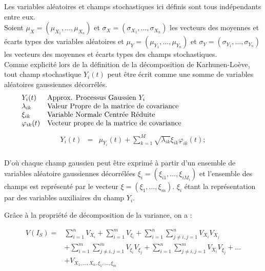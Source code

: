 \documentclass[a4paper,10pt]{article}
\begin{document}
Les variables aléatoires et champs stochastiques ici définis sont tous indépendants entre eux. \\

Soient $\mu_{X}=(\mu_{X_{1}},\ldots,\mu_{X_{n}})$ et $\sigma_{X}=(\sigma_{X_{1}},\ldots,\sigma_{X_{n}})$ les vecteurs des moyennes et écarts types des variables aléatoires et $\mu_{Y}=(\mu_{Y_{1}},\ldots,\mu_{Y_{n}})$ et $\sigma_{Y}=(\sigma_{Y_{1}},\ldots,\sigma_{Y_{n}})$ les vecteurs des moyennes et écarts types des champs stochastiques. \\

Comme explicité lors de la définition de la décomposition de Karhunen-Loève, tout champ stochastique $Y_{i}(t)$ peut être écrit comme une somme de variables aléatoires gaussiennes décorrélés. 
\[
	\begin{array}{lp{0.8\linewidth}}
		Y_{i}(t)		& Approx. Processus Gaussien $Y_{i}$ \\
		\lambda_{ik}	& Valeur Propre de la matrice de covariance \\
		\xi_{ik}		& Variable Normale Centrée Réduite \\
		\varphi_{ik}(t)	& Vecteur propre de la matrice de covariance
	\end{array}
\]
   \begin{eqnarray}
Y_{i}(t) & = & \mu_{Y_{i}}(t) +  \sum_{k=1}^{M}\sqrt{\lambda_{ik}}\xi_{ik}\varphi_{ik}(t);
   \end{eqnarray}\\

D'où chaque champ gaussien peut être exprimé à partir d'un ensemble de variables aléatoire gaussiennes décorrélées $\xi_{i}=(\xi_{i1},\ldots,\xi_{iM_{i}})$ et l'ensemble des champs est représenté par le vecteur $\xi=(\xi_{1},\ldots,\xi_{m})$. $\xi_{i}$ étant la représentation par des variables auxiliaires du champ $Y_{i}$. 

Grâce à la propriété de décomposition de la variance, on a :

\begin{equation}
\begin{aligned}
V(I_{S}) = &  \sum_{i=1}^{n} V_{X_{i}} + \sum_{i=1}^{m} V_{\xi_{i}} + \sum_{i=1}^{n} \sum_{j \neq i,j=1}^{n} V_{X_{i}} V_{X_{j}} \\
    	   & + \sum_{i=1}^{m} \sum_{j \neq i,j=1}^{m} V_{\xi_{i}} V_{\xi_{j}} + \sum_{i=1}^{n} \sum_{j \neq i,j=1}^{m} V_{X_{i}} V_{\xi_{j}} + \ldots \\ 
           & + V_{X_{1},\ldots,X_{n},\xi_{1},\ldots,\xi_{m}}
\end{aligned}
\end{equation}
\end{document}
